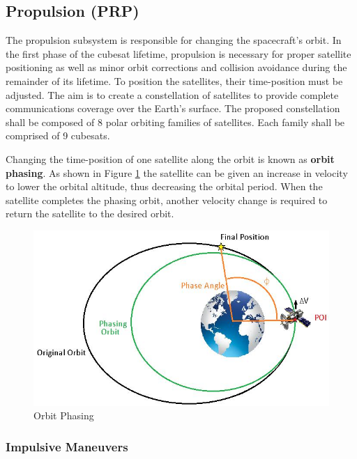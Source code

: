 \subsection{Propulsion (PRP)}

The propulsion subsystem is responsible for changing the spacecraft's orbit. In the first phase of the cubesat lifetime, propulsion is necessary for proper satellite positioning as well as minor orbit corrections and collision avoidance during the remainder of its lifetime. To position the satellites, their time-position must be  adjusted. The aim is to create a constellation of satellites to provide complete communications coverage over the Earth's surface. The proposed constellation shall be composed of 8 polar orbiting families of satellites. Each family shall be comprised of 9 cubesats.

Changing the time-position of one satellite along the orbit is known as \textbf{orbit phasing}. As shown in Figure \ref{fig:orbit_phasing} the satellite can be given an increase in velocity to lower the orbital altitude, thus decreasing the orbital period. When the satellite completes the phasing orbit, another velocity change is required to return the satellite to the desired orbit.

\begin{figure}[h!]
	\centering
	\includegraphics[scale=0.5]{img/Orbit_Phase.jpg}
	\caption{Orbit Phasing}
	\label{fig:orbit_phasing}
\end{figure}

\subsubsection{Impulsive Maneuvers} \label{Impulsive}

